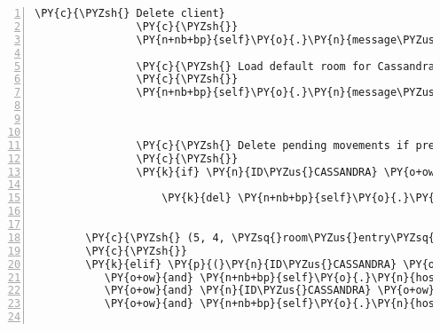 \begin{Verbatim}[commandchars=\\\{\},numbers=left,firstnumber=1,stepnumber=1]
                \PY{c}{\PYZsh{} Delete client}
                \PY{c}{\PYZsh{}}
                \PY{n+nb+bp}{self}\PY{o}{.}\PY{n}{message\PYZus{}for\PYZus{}host}\PY{o}{.}\PY{n}{event\PYZus{}list}\PY{o}{.}\PY{n}{append}\PY{p}{(}\PY{n}{fabula}\PY{o}{.}\PY{n}{DeleteEvent}\PY{p}{(}\PY{n}{ID\PYZus{}CASSANDRA}\PY{p}{)}\PY{p}{)}

                \PY{c}{\PYZsh{} Load default room for Cassandra and spawn her at position (5, 3)}
                \PY{c}{\PYZsh{}}
                \PY{n+nb+bp}{self}\PY{o}{.}\PY{n}{message\PYZus{}for\PYZus{}host}\PY{o}{.}\PY{n}{event\PYZus{}list}\PY{o}{.}\PY{n}{extend}\PY{p}{(}\PY{n+nb+bp}{self}\PY{o}{.}\PY{n}{\PYZus{}load\PYZus{}room}\PY{p}{(}\PY{n}{ID\PYZus{}CASSANDRA}\PY{p}{,}
                                                                        \PY{l+s}{\PYZdq{}}\PY{l+s}{default}\PY{l+s}{\PYZdq{}}\PY{p}{,}
                                                                        \PY{p}{(}\PY{l+m+mi}{5}\PY{p}{,} \PY{l+m+mi}{3}\PY{p}{)}\PY{p}{)}\PY{p}{)}

                \PY{c}{\PYZsh{} Delete pending movements if present}
                \PY{c}{\PYZsh{}}
                \PY{k}{if} \PY{n}{ID\PYZus{}CASSANDRA} \PY{o+ow}{in} \PY{n+nb+bp}{self}\PY{o}{.}\PY{n}{tries\PYZus{}to\PYZus{}move\PYZus{}dict}\PY{o}{.}\PY{n}{keys}\PY{p}{(}\PY{p}{)}\PY{p}{:}

                    \PY{k}{del} \PY{n+nb+bp}{self}\PY{o}{.}\PY{n}{tries\PYZus{}to\PYZus{}move\PYZus{}dict}\PY{p}{[}\PY{n}{ID\PYZus{}CASSANDRA}\PY{p}{]}


        \PY{c}{\PYZsh{} (5, 4, \PYZsq{}room\PYZus{}entry\PYZsq{}) \PYZhy{}\PYZgt{} Teleports Cassandra to room\PYZus{}cassandra}
        \PY{c}{\PYZsh{}}
        \PY{k}{elif} \PY{p}{(}\PY{n}{ID\PYZus{}CASSANDRA} \PY{o+ow}{in} \PY{n+nb+bp}{self}\PY{o}{.}\PY{n}{host}\PY{o}{.}\PY{n}{room\PYZus{}by\PYZus{}client}\PY{o}{.}\PY{n}{keys}\PY{p}{(}\PY{p}{)}
           \PY{o+ow}{and} \PY{n+nb+bp}{self}\PY{o}{.}\PY{n}{host}\PY{o}{.}\PY{n}{room\PYZus{}by\PYZus{}client}\PY{p}{[}\PY{n}{ID\PYZus{}CASSANDRA}\PY{p}{]}\PY{o}{.}\PY{n}{identifier} \PY{o}{==} \PY{l+s}{\PYZdq{}}\PY{l+s}{room\PYZus{}entry}\PY{l+s}{\PYZdq{}}
           \PY{o+ow}{and} \PY{n}{ID\PYZus{}CASSANDRA} \PY{o+ow}{in} \PY{n+nb+bp}{self}\PY{o}{.}\PY{n}{host}\PY{o}{.}\PY{n}{room\PYZus{}by\PYZus{}client}\PY{p}{[}\PY{n}{ID\PYZus{}CASSANDRA}\PY{p}{]}\PY{o}{.}\PY{n}{entity\PYZus{}locations}\PY{o}{.}\PY{n}{keys}\PY{p}{(}\PY{p}{)}
           \PY{o+ow}{and} \PY{n+nb+bp}{self}\PY{o}{.}\PY{n}{host}\PY{o}{.}\PY{n}{room\PYZus{}by\PYZus{}client}\PY{p}{[}\PY{n}{ID\PYZus{}CASSANDRA}\PY{p}{]}\PY{o}{.}\PY{n}{entity\PYZus{}locations}\PY{p}{[}\PY{n}{ID\PYZus{}CASSANDRA}\PY{p}{]} \PY{o}{==} \PY{p}{(}\PY{l+m+mi}{5}\PY{p}{,} \PY{l+m+mi}{4}\PY{p}{)}\PY{p}{)}\PY{p}{:}


\end{Verbatim}
